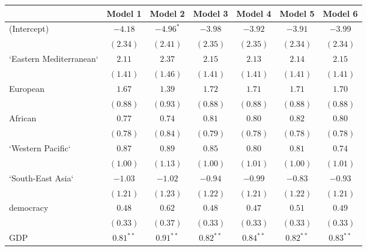 
\begin{table}[!h]
\begin{center}
\begin{tabular}{l c c c c c c }
\toprule
 & Model 1 & Model 2 & Model 3 & Model 4 & Model 5 & Model 6 \\
\midrule
(Intercept)             & $-4.18$      & $-4.96^{*}$  & $-3.98$      & $-3.92$      & $-3.91$      & $-3.99$      \\
                        & $(2.34)$     & $(2.41)$     & $(2.35)$     & $(2.35)$     & $(2.34)$     & $(2.34)$     \\
`Eastern Mediterranean` & $2.11$       & $2.37$       & $2.15$       & $2.13$       & $2.14$       & $2.15$       \\
                        & $(1.41)$     & $(1.46)$     & $(1.41)$     & $(1.41)$     & $(1.41)$     & $(1.41)$     \\
European                & $1.67$       & $1.39$       & $1.72$       & $1.71$       & $1.71$       & $1.70$       \\
                        & $(0.88)$     & $(0.93)$     & $(0.88)$     & $(0.88)$     & $(0.88)$     & $(0.88)$     \\
African                 & $0.77$       & $0.74$       & $0.81$       & $0.80$       & $0.82$       & $0.80$       \\
                        & $(0.78)$     & $(0.84)$     & $(0.79)$     & $(0.78)$     & $(0.78)$     & $(0.78)$     \\
`Western Pacific`       & $0.87$       & $0.89$       & $0.85$       & $0.80$       & $0.81$       & $0.74$       \\
                        & $(1.00)$     & $(1.13)$     & $(1.00)$     & $(1.01)$     & $(1.00)$     & $(1.01)$     \\
`South-East Asia`       & $-1.03$      & $-1.02$      & $-0.94$      & $-0.99$      & $-0.83$      & $-0.93$      \\
                        & $(1.21)$     & $(1.23)$     & $(1.22)$     & $(1.21)$     & $(1.22)$     & $(1.21)$     \\
democracy               & $0.48$       & $0.62$       & $0.48$       & $0.47$       & $0.51$       & $0.49$       \\
                        & $(0.33)$     & $(0.37)$     & $(0.33)$     & $(0.33)$     & $(0.33)$     & $(0.33)$     \\
GDP                     & $0.81^{**}$  & $0.91^{**}$  & $0.82^{**}$  & $0.84^{**}$  & $0.82^{**}$  & $0.83^{**}$  \\

\end{tabular}
\end{center}
\end{table}
